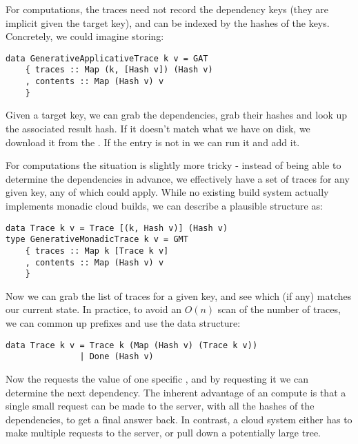 For  computations, the traces need not record the dependency keys (they are implicit given the target key), and can be indexed by the hashes of the keys. Concretely, we could imagine storing:

\begin{verbatim}
data GenerativeApplicativeTrace k v = GAT
    { traces :: Map (k, [Hash v]) (Hash v)
    , contents :: Map (Hash v) v
    }
\end{verbatim}

Given a target key, we can grab the dependencies, grab their hashes and look up the associated result hash. If it doesn't match what we have on disk, we download it from the . If the entry is not in  we can run it and add it.

For  computations the situation is slightly more tricky - instead of being able to determine the dependencies in advance, we effectively have a set of traces for any given key, any of which could apply. While no existing build system actually implements monadic cloud builds, we can describe a plausible structure as:

\begin{verbatim}
data Trace k v = Trace [(k, Hash v)] (Hash v)
type GenerativeMonadicTrace k v = GMT
    { traces :: Map k [Trace k v]
    , contents :: Map (Hash v) v
    }
\end{verbatim}

Now we can grab the list of traces for a given key, and see which (if any) matches our current state. In practice, to avoid an $O(n)$ scan of the number of traces, we can common up prefixes and use the data structure:

\begin{verbatim}
data Trace k v = Trace k (Map (Hash v) (Trace k v))
               | Done (Hash v)
\end{verbatim}

Now the  requests the value of one specific , and by requesting it we can determine the next dependency. The inherent advantage of an  compute is that a single small request can be made to the server, with all the hashes of the dependencies, to get a final answer back. In contrast, a  cloud system either has to make multiple requests to the server, or pull down a potentially large  tree.



